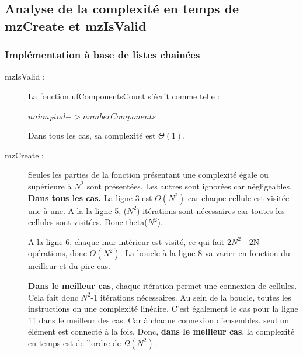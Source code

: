 \documentclass[11pt]{article}
\begin{document}
\subsection{Analyse de la complexité en temps de mzCreate et mzIsValid}

\subsubsection{Implémentation à base de listes chainées}
\begin{description}
\item[mzIsValid :]La fonction ufComponentsCount s'écrit comme telle :
\begin{codebox}
\li \Return $union_Find->numberComponents$
\end{codebox}
Dans tous les cas, sa complexité est $\Theta(1)$.



\item[mzCreate :] Seules les parties de la fonction présentant une complexité égale ou supérieure à $N^{2}$ sont présentées. Les autres sont ignorées car négligeables. \textbf{Dans tous les cas.} La ligne 3 est $\Theta(N^{2})$ car chaque cellule est visitée une à une. A la la ligne 5, ($N^{2}$) itérations sont nécessaires car toutes les cellules sont visitées. Donc theta($N^{2}$).

A la ligne 6, chaque mur intérieur est visité, ce qui fait 2$N^{2}$ - 2N opérations, donc $\Theta(N^{2})$.
La boucle à la ligne 8 va varier en fonction du meilleur et du pire cas. 

\textbf{Dans le meilleur cas}, chaque itération permet une connexion de cellules. Cela fait donc $N^{2}$-1 itérations nécessaires. Au sein de la boucle, toutes les instructions on une complexité linéaire. C'est également le cas pour la ligne 11 dans le meilleur des cas. Car à chaque connexion d'ensembles, seul un élément est connecté à la fois. Donc,\textbf{ dans le meilleur cas}, la complexité en temps est de l'ordre de $\Omega(N^{2})$. 


\end{description}
\end{document}
